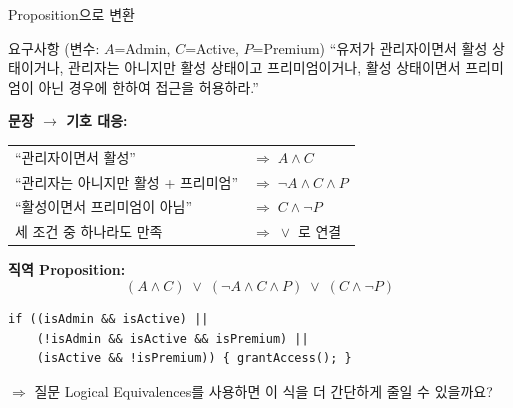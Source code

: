 \documentclass[10.5pt,compress]{beamer}
\begin{document}
\begin{frame}[fragile,t]{Proposition으로 변환}
    \footnotesize
    \begin{block}{요구사항 \small(변수: $A$=Admin, $C$=Active, $P$=Premium)}
        ``유저가 관리자이면서 활성 상태이거나, 관리자는 아니지만 활성 상태이고 프리미엄이거나,
        활성 상태이면서 프리미엄이 아닌 경우에 한하여 접근을 허용하라.''
    \end{block}

    \textbf{문장 $\rightarrow$ 기호 대응:}
    \begin{center}
    \scriptsize
    \renewcommand{\arraystretch}{1.0}
    \begin{tabular}{ll}
        ``관리자이면서 활성'' & $\Rightarrow\; A \land C$ \\
        ``관리자는 아니지만 활성 + 프리미엄'' & $\Rightarrow\; \neg A \land C \land P$ \\
        ``활성이면서 프리미엄이 아님'' & $\Rightarrow\; C \land \neg P$ \\
        세 조건 중 하나라도 만족 & $\Rightarrow\; \lor$ 로 연결 \\
    \end{tabular}
    \renewcommand{\arraystretch}{1}
    \end{center}

    \textbf{직역 Proposition:}
    \[
        (A \land C) \;\lor\; (\neg A \land C \land P) \;\lor\; (C \land \neg P)
    \]

\begin{lstlisting}[style=cpp]
if ((isAdmin && isActive) ||
    (!isAdmin && isActive && isPremium) ||
    (isActive && !isPremium)) { grantAccess(); }
\end{lstlisting}
    \begin{exampleblock}{$\Rightarrow$ 질문}
        \footnotesize Logical Equivalences를 사용하면 이 식을 더 간단하게 줄일 수 있을까요?
    \end{exampleblock}
\end{frame}
\end{document}
